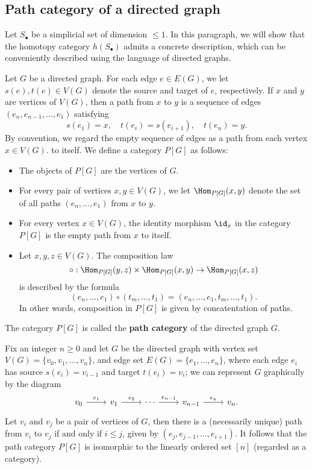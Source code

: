 \subsection{Path category of a directed graph}
Let $S_\bullet$ be a simplicial set of dimension $\leq 1$. In this paragraph, we will show that the homotopy category $h(S_\bullet)$ admits a concrete description, which can be conveniently described using the language of directed graphs.\par
Let $G$ be a directed graph. For each edge $e\in E(G)$, we let $s(e),t(e)\in V(G)$ denote the source and target of $e$, respectively. If $x$ and $y$ are vertices of $V(G)$, then a path from $x$ to $y$ is a sequence of edges $(e_n,e_{n-1},\dots,e_1)$ satisfying
\[s(e_1)=x,\quad t(e_i)=s(e_{i+1}),\quad t(e_n)=y.\]
 By convention, we regard the empty sequence of edges as a path from each vertex $x\in V(G)$. to itself. We define a category $P[G]$ as follows:
\begin{itemize}
\item The objects of $P[G]$ are the vertices of $G$.
\item For every pair of vertices $x,y\in V(G)$, we let $\Hom_{P[G]}(x,y)$ denote the set of all paths $(e_n,\dots,e_1)$ from $x$ to $y$.
\item For every vertex $x\in V(G)$, the identity morphism $\id_x$ in the category $P[G]$ is the empty path from $x$ to itself.
\item Let $x,y,z\in V(G)$. The composition law
\[\circ:\Hom_{P[G]}(y,z)\times\Hom_{P[G]}(x,y)\to\Hom_{P[G]}(x,z)\]
is described by the formula
\[(e_n,\dots,e_1)\circ(t_m,\dots,t_1)=(e_n,\dots,e_1,t_m,\dots,t_1).\]
In other words, composition in $P[G]$ is given by concatentation of paths.
\end{itemize}
The category $P[G]$ is called the \textbf{path category} of the directed graph $G$.
\begin{example}
Fix an integer $n\geq 0$ and let $G$ be the directed graph with vertex set $V(G)=\{v_0,v_1,\dots,v_n\}$, and edge set $E(G)=\{e_1,\dots,e_n\}$, where each edge $e_i$ has source $s(e_i)=v_{i-1}$ and target $t(e_i)=v_i$; we can represent $G$ graphically by the diagram
\[\begin{tikzcd}
v_0\ar[r,"e_1"]&v_1\ar[r,"e_2"]&\cdots\ar[r,"e_{n-1}"]&v_{n-1}\ar[r,"e_n"]&v_n.
\end{tikzcd}\]
Let $v_i$ and $v_j$ be a pair of vertices of $G$, then there is a (necessarily unique) path from $v_i$ to $v_j$ if and only if $i\leq j$, given by $(e_j,e_{j-1},\dots,e_{i+1})$. It follows that the path category $P[G]$ is isomorphic to the linearly ordered set $[n]$ (regarded as a category).
\end{example}
